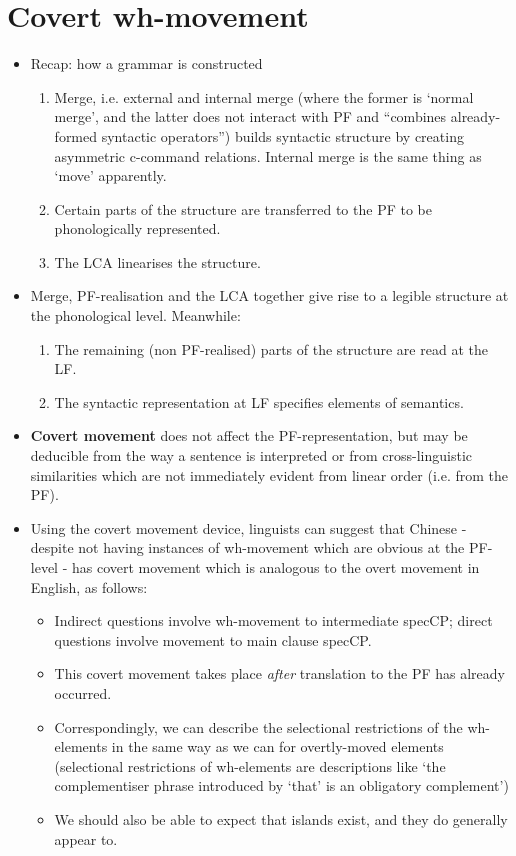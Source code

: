 \documentclass{article}
\begin{document}
\section{Covert wh-movement}
\begin{itemize}
    \item Recap: how a grammar is constructed
    \begin{enumerate}
        \item Merge, i.e. external and internal merge (where the former is `normal merge', and the latter does not interact with PF and ``combines already-formed syntactic operators'') builds syntactic structure by creating asymmetric c-command relations. Internal merge is the same thing as `move' apparently.
        \item Certain parts of the structure are transferred to the PF to be phonologically represented.
        \item The LCA linearises the structure.
    \end{enumerate}
    \item Merge, PF-realisation and the LCA together give rise to a legible structure at the phonological level. Meanwhile:
    \begin{enumerate}
        \item The remaining (non PF-realised) parts of the structure are read at the LF.
        \item The syntactic representation at LF specifies elements of semantics.
    \end{enumerate}
    \item \textbf{Covert movement} does not affect the PF-representation, but may be deducible from the way a sentence is interpreted or from cross-linguistic similarities which are not immediately evident from linear order (i.e. from the PF).
    \item Using the covert movement device, linguists can suggest that Chinese - despite not having instances of wh-movement which are obvious at the PF-level - has covert movement which is analogous to the overt movement in English, as follows:
    \begin{itemize}
        \item Indirect questions involve wh-movement to intermediate specCP; direct questions involve movement to main clause specCP.
        \item This covert movement takes place \textit{after} translation to the PF has already occurred.
        \item Correspondingly, we can describe the selectional restrictions of the wh-elements in the same way as we can for overtly-moved elements (selectional restrictions of wh-elements are descriptions like `the complementiser phrase introduced by `that' is an obligatory complement')
        \item We should also be able to expect that islands exist, and they do generally appear to.
    \end{itemize}

\end{itemize}
\end{document}
